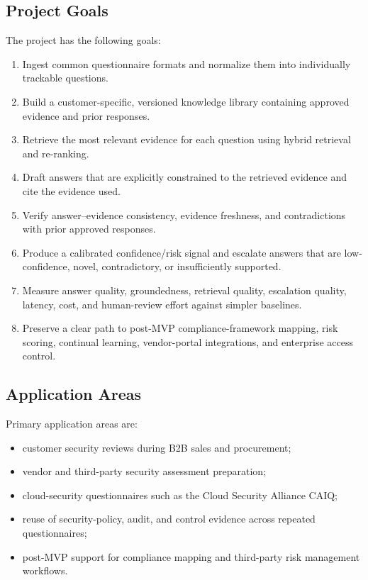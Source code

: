\documentclass[11pt,journal,onecolumn]{IEEEtran}
\begin{document}
\subsection{Project Goals}
The project has the following goals:
\begin{enumerate}[leftmargin=1.7em]
    \item Ingest common questionnaire formats and normalize them into individually trackable questions.
    \item Build a customer-specific, versioned knowledge library containing approved evidence and prior responses.
    \item Retrieve the most relevant evidence for each question using hybrid retrieval and re-ranking.
    \item Draft answers that are explicitly constrained to the retrieved evidence and cite the evidence used.
    \item Verify answer--evidence consistency, evidence freshness, and contradictions with prior approved responses.
    \item Produce a calibrated confidence/risk signal and escalate answers that are low-confidence, novel, contradictory, or insufficiently supported.
    \item Measure answer quality, groundedness, retrieval quality, escalation quality, latency, cost, and human-review effort against simpler baselines.
    \item Preserve a clear path to post-MVP compliance-framework mapping, risk scoring, continual learning, vendor-portal integrations, and enterprise access control.
\end{enumerate}

\subsection{Application Areas}
Primary application areas are:
\begin{itemize}[leftmargin=1.7em]
    \item customer security reviews during B2B sales and procurement;
    \item vendor and third-party security assessment preparation;
    \item cloud-security questionnaires such as the Cloud Security Alliance CAIQ;
    \item reuse of security-policy, audit, and control evidence across repeated questionnaires;
    \item post-MVP support for compliance mapping and third-party risk management workflows.
\end{itemize}
\end{document}
